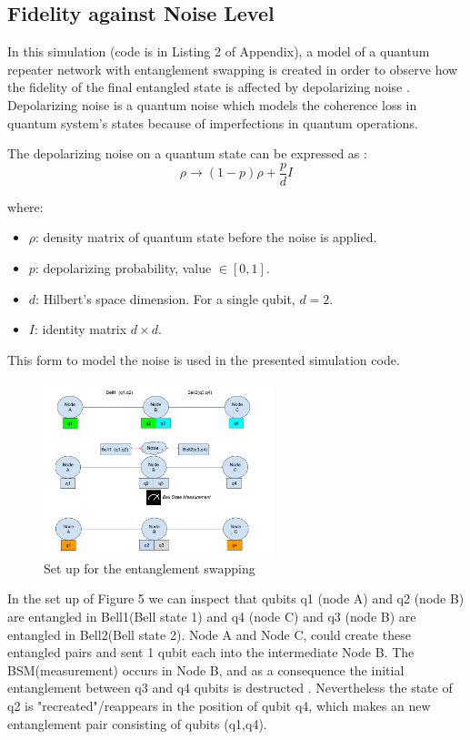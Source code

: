 \documentclass[12pt]{ieeetj}
\begin{document}
		\subsection{Fidelity against Noise Level}	
		
		In this simulation (code is in Listing 2 of Appendix), a model of a quantum repeater network with
		entanglement swapping is created in order to observe how the fidelity of the final entangled state is
		affected by depolarizing noise \cite{depolarization}. Depolarizing noise is a quantum noise which models the
		coherence loss in quantum system's states because of imperfections in quantum operations.
		
		The depolarizing noise on a quantum state can be expressed as \cite{depolar2}:
			\[
			\rho \to (1-p)\rho + \frac{p}{d}I
			\]

		where:

		\begin{itemize}
			    \item \( \rho \): density matrix of quantum state before the noise is applied.
			    \item \( p \): depolarizing probability,  value \(\in [0, 1]\).
			    \item \( d \): Hilbert's space dimension. For a single qubit, \( d = 2 \).
			    \item \( I \): identity matrix \( d \times d \).
		\end{itemize}

		This form to model the noise is used in the presented simulation code.
	
		\begin{figure}[H]
			\centering
			\includegraphics[width=0.6\textwidth]{repeater/entanglement_swap.png}
			\caption{Set up for the entanglement swapping}
			\label{fig5:}
		\end{figure}		

		In the set up of Figure 5 we can inspect that qubits q1 (node A) and q2 (node B) are
		entangled in Bell1(Bell state 1) and q4 (node C) and q3 (node B) are entangled in Bell2(Bell state 2).
		Node A and Node C, could create these entangled pairs and sent 1 qubit each into the intermediate
		Node B. The BSM(measurement) occurs in Node B, and as a consequence the initial entanglement between
		q3 and q4 qubits is destructed \cite{rfc}. Nevertheless the state of q2 is "recreated"/reappears in the position
		of qubit q4, which makes an new entanglement pair consisting of qubits (q1,q4).
\end{document}
